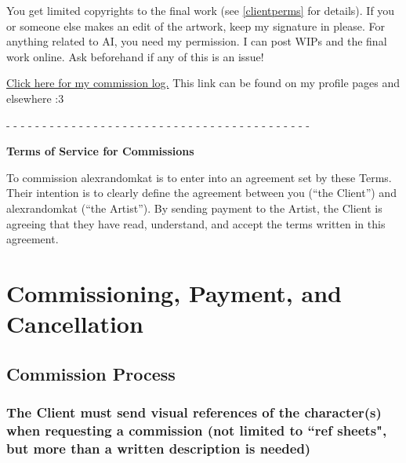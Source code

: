 \documentclass{article}
\newcommand{\hcm}[1][1]{\hspace{#1 cm}}
\begin{document}
\begin{flushleft}
\begin{center}
{		You get limited copyrights to the final work (see \ref{clientperms} for details). If you or someone else makes an edit of the artwork, keep my signature in please. For anything related to AI, you need my permission. I can post WIPs and the final work online. Ask beforehand if any of this is an issue!\\\hcm

		\href{https://github.com/AlexRandomkat/alexrandomkatCommLog/blob/main/alexrandomkat-commlog-PUBLIC.pdf}{Click here for my commission log.} This link can be found on my profile pages and elsewhere :3\\\hcm
		
		\begin{center}
			- - - - - - - - - - - - - - - - - - - - - - - - - - - - - - - - - - - - - - - - - -
		\end{center}
	}
\end{center}
\newpage

\begin{center}
	\parbox{14cm}{
		\begin{center}
			\textbf{\Large Terms of Service for Commissions}\\\hcm
			
			To commission alexrandomkat is to enter into an agreement set by these Terms. Their intention is to clearly define the agreement  between you (``the Client'') and alexrandomkat (``the Artist''). By sending payment to the Artist, the Client is agreeing that they have read, understand, and accept the terms written in this agreement.\\\hcm
		\end{center}
	}
\end{center}
\tableofcontents
\newpage

\section{Commissioning, Payment, and Cancellation}
\leftskip=1cm
	\subsection{Commission Process}
	\leftskip=2cm
		
 		\subsubsection[Character Description]{\normalfont The Client must send visual references of the character(s) when requesting a commission (not limited to ``ref sheets", but more than a written description is needed)}


\end{flushleft}
\end{document}
